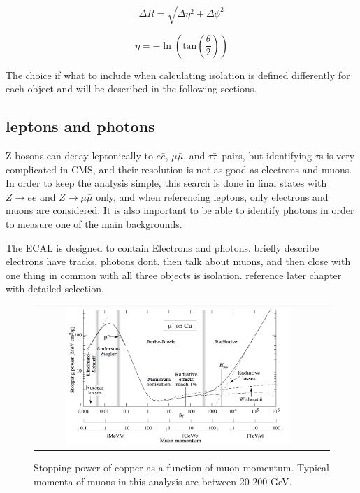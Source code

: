 \begin{equation}
  \label{eqn:DR}
  \Delta R = \sqrt{\Delta\eta^{2}+\Delta\phi^{2}}
\end{equation}

\begin{equation}
  \label{eqn:psuedorapidity}
  \eta = -\ln(\mathrm{tan}(\frac{\theta}{2}))
\end{equation}

The choice if what to include when calculating isolation is defined differently for each object and will be described in the following sections.

\subsection{leptons and photons}
\label{ssec:lepsandphots}
Z bosons can decay leptonically to $e\bar{e}$, $\mu\bar{\mu}$, and $\tau\bar{\tau}$~pairs,
but identifying $\tau$s is very complicated in CMS, and their resolution is not as good as electrons and muons.
In order to keep the analysis simple, this search is done in final states with $Z\rightarrow ee$ and $Z\rightarrow\mu\bar{\mu}$ only,
and when referencing leptons, only electrons and muons are considered.
It is also important to be able to identify photons in order to measure one of the main backgrounds.

The ECAL is designed to contain Electrons and photons.
briefly describe electrons have tracks, photons dont.
then talk about muons, and then close with one thing in common with all three objects is isolation.
reference later chapter with detailed selection.


\begin{figure}[!ht]
\begin{center}
\begin{tabular}{cc}
\includegraphics[width=0.8\textwidth]{cms/figs/muon_energy_loss.png}
\end{tabular}
\caption{ Stopping power of copper as a function of muon momentum. Typical momenta of muons in this analysis are between 20-200 GeV. 
\label{fig:muonenergyloss}
}
\end{center}
\end{figure}


